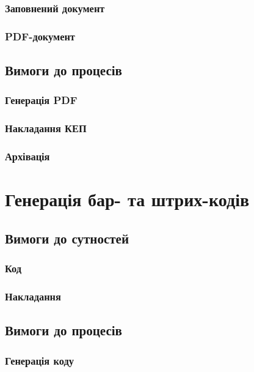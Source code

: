 \subsubsection{Заповнений документ}

\subsubsection{PDF-документ}

\subsection{Вимоги до процесів}

\subsubsection{Генерація PDF}

\subsubsection{Накладання КЕП}

\subsubsection{Архівація}

\section{Генерація бар- та штрих-кодів}

\subsection{Вимоги до сутностей}

\subsubsection{Код}

\subsubsection{Накладання}

\subsection{Вимоги до процесів}

\subsubsection{Генерація коду}

